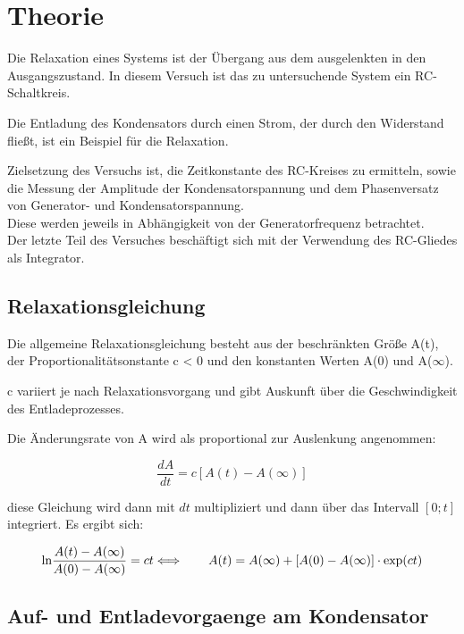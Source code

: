 \section{Theorie}
\label{sec:Theorie}

Die Relaxation eines Systems ist der Übergang aus dem ausgelenkten in den Ausgangszustand.
In diesem Versuch ist das zu untersuchende System ein RC-Schaltkreis.

Die Entladung des Kondensators durch einen Strom, der durch den Widerstand fließt, 
ist ein Beispiel für die Relaxation.

Zielsetzung des Versuchs ist, die Zeitkonstante des RC-Kreises zu ermitteln, sowie die
Messung der Amplitude der Kondensatorspannung und dem Phasenversatz von
Generator- und Kondensatorspannung.\\
Diese werden jeweils in Abhängigkeit von der Generatorfrequenz betrachtet.\\
Der letzte Teil des Versuches beschäftigt sich mit der Verwendung des RC-Gliedes als Integrator.

\subsection{Relaxationsgleichung}
\label{subsec:Die Relaxationsgleichung}

Die allgemeine Relaxationsgleichung besteht aus der beschränkten Größe A(t), der Proportionalitätsonstante c < 0 
und den konstanten
Werten A(0) und A($\infty$).

c variiert je nach Relaxationsvorgang und gibt Auskunft über die Geschwindigkeit des Entladeprozesses.

Die Änderungsrate von A wird als proportional zur Auslenkung angenommen:

\begin{equation} 
    \label{Rel_allg}
\frac{dA}{dt} = c[A(t)-A(\infty)]
\end{equation}

diese Gleichung wird dann mit $dt$ multipliziert und dann über das Intervall $[0; t]$ integriert. 
Es ergibt sich:

\begin{equation} 
    \label{Rel_RC}
    \textrm{ln}\frac{A(t)-A(\infty)}{A(0)-A(\infty)} = ct \\
\Longleftrightarrow\qquad A(t) = A(\infty) + [A(0)-A(\infty)] \cdot \textrm{exp}(ct)
\end{equation}


\subsection{Auf- und Entladevorgaenge am Kondensator}
\label{subsec:Entladevorgaenge am Kondensator}

